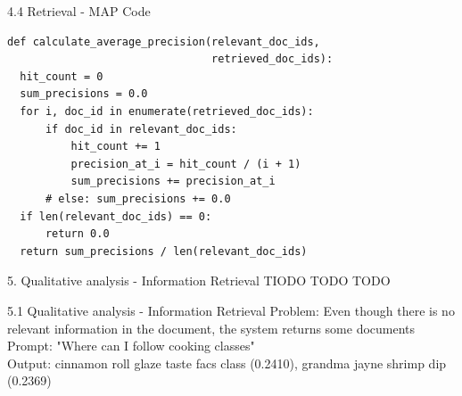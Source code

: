 \documentclass{beamer}
\begin{document}
\begin{frame}[fragile]{4.4 Retrieval - MAP Code}
  \begin{verbatim}
def calculate_average_precision(relevant_doc_ids,
                                retrieved_doc_ids):
  hit_count = 0
  sum_precisions = 0.0
  for i, doc_id in enumerate(retrieved_doc_ids):
      if doc_id in relevant_doc_ids:
          hit_count += 1
          precision_at_i = hit_count / (i + 1)
          sum_precisions += precision_at_i
      # else: sum_precisions += 0.0
  if len(relevant_doc_ids) == 0:
      return 0.0
  return sum_precisions / len(relevant_doc_ids)
  \end{verbatim}
\end{frame}

\begin{frame} {5. Qualitative analysis - Information Retrieval}
  TIODO TODO TODO
\end{frame}

\begin{frame} {5.1 Qualitative analysis - Information Retrieval}
  Problem: Even though there is no relevant information in the document, the system returns some documents\\
  Prompt: "Where can I follow cooking classes"\\
  Output: cinnamon roll glaze taste facs class (0.2410), grandma jayne shrimp dip (0.2369)
\end{frame}
\end{document}

